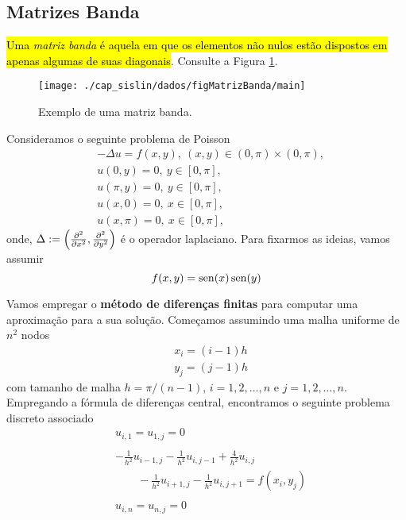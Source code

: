 \subsection{Matrizes Banda}

\hl{Uma \emph{matriz banda} é aquela em que os elementos não nulos estão dispostos em apenas algumas de suas diagonais}. Consulte a Figura \ref{fig:MatrizBanda}.

\begin{figure}[H]
  \centering
  \texttt{[image: ./cap\_sislin/dados/figMatrizBanda/main]}
  \caption{Exemplo de uma matriz banda.}
  \label{fig:MatrizBanda}
\end{figure}

\begin{ex}\label{ex:poisson}
  Consideramos o seguinte problema de Poisson{\poisson}
  \begin{align}
    &- \Delta u = f(x,y),~(x, y)\in (0, \pi)\times (0, \pi),\\
    &u(0, y) = 0,~y\in [0, \pi],\\
    &u(\pi, y) = 0,~y\in [0, \pi],\\
    &u(x, 0) = 0,~x\in [0, \pi],\\
    &u(x, \pi) = 0,~x\in [0, \pi],
  \end{align}
  onde, $\Delta := \left(\frac{\partial^2}{\partial x^2}, \frac{\partial^2}{\partial y^2}\right)$ é o operador laplaciano{\laplace}. Para fixarmos as ideias, vamos assumir
  \begin{equation}
    f(x,y) = \operatorname{sen}(x)\operatorname{sen}(y)
  \end{equation}
  
  Vamos empregar o \textbf{método de diferenças finitas} para computar uma aproximação para a sua solução. Começamos assumindo uma malha uniforme de $n^2$ nodos
  \begin{align}
    & x_i = (i-1)h\\
    & y_j = (j-1)h
  \end{align}
  com tamanho de malha $h = \pi/(n-1)$, $i=1,2,\dotsc,n$ e $j=1,2,\dotsc,n$. Empregando a fórmula de diferenças central, encontramos o seguinte problema discreto associado
  \begin{align}
    &u_{i, 1} = u_{1, j} = 0\\
    &~\nonumber\\
    &- \frac{1}{h^2}u_{i-1,j} - \frac{1}{h^2}u_{i,j-1} + \frac{4}{h^2}u_{i,j} \nonumber\\
    &\qquad- \frac{1}{h^2}u_{i+1,j} - \frac{1}{h^2}u_{i,j+1} = f(x_i, y_j)\\
    &~\nonumber\\
    &u_{i,n} = u_{n,j} = 0
  \end{align}


\end{ex}
